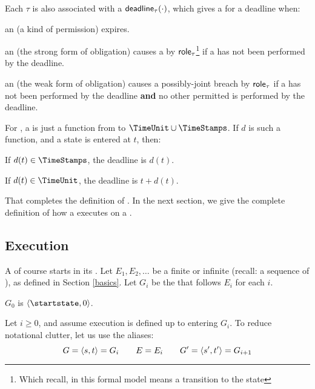 \documentclass[12pt]{article}
\begin{document}
Each \transition $\tau$ is also associated with a  $\textsf{deadline}_{\tau}(\cdot)$, which gives a \TimeStamp for a deadline when: 
	\begin{LPPI}
	\item an \enabled \mayntran (a kind of permission) expires.
	\item an \enabled \mustntran (the strong form of obligation) causes a \breach by $\textsf{role}_{\tau}$\footnote{Which recall, in this formal model means a transition to the state \breachby{\{\role{\tau}\}}} if a \compatible \Event has not been performed by the deadline. 
	\item an \enabled \rmustntran (the weak form of obligation) causes a possibly-joint breach by $\textsf{role}_{\tau}$ if a \compatible \Event has not been performed by the deadline {\bf and} no other permitted \Event is performed by the deadline. 
	\end{LPPI}
For \FSContracts, a \DeadlineFn is just a function from \TimeStamps to $\TimeUnit \cup \TimeStamps$. If $d$ is such a function, and a state is entered at \TimeStamp $t$, then:
\begin{LPPI}
\item If $d(t) \in \TimeStamps$, the deadline is $d(t)$.
	\item If $d(t) \in \TimeUnit$, the deadline is $t + d(t)$.
\end{LPPI}

That completes the definition of \FSContract. In the next section, we give the complete definition of how a \FSContract executes on a \trace.

\subsection{Execution}
A \FSContract of course starts in its \startstate. Let $E_1, E_2, \dots$ be a finite or infinite \trace (recall: a sequence of \Events), as defined in Section \ref{basics}. Let $G_i$ be the \GlobalState that follows $E_i$ for each $i$.

$G_0$ is $\tup{\startstate, 0}$.  

Let $i \geq 0$, and assume execution is defined up to entering $G_i$. To reduce notational clutter, let us use the aliases:
\[ G = \langle s,t\rangle = G_i  \qquad E = E_i \qquad  G' = \langle s',t'\rangle = G_{i+1} \]
\end{document}
